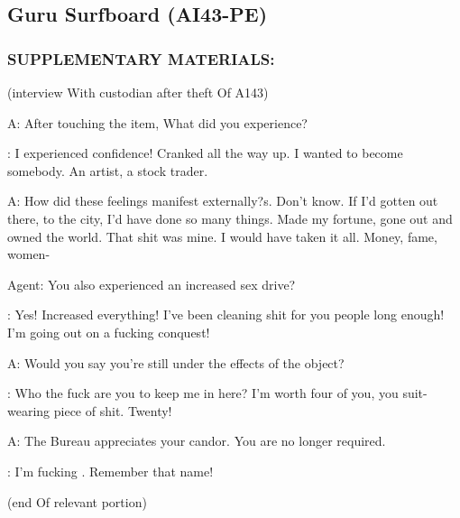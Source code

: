 \subsection*{Guru Surfboard (AI43-PE)}
\subsubsection*{SUPPLEMENTARY MATERIALS:}
\par (interview With custodian
after theft Of A143)
\par A: After touching the item, What did you experience?
\par {}: I experienced confidence! Cranked all the way up. I wanted
to become somebody. An artist, a stock trader.
\par A: How did these feelings manifest externally?s. Don't know. If I'd gotten out there, to the city, I'd have done
so many things. Made my fortune, gone out and owned the world.
That shit was mine. I would have taken it all. Money, fame,
women-
\par Agent: You also experienced an increased sex drive?
\par {}: Yes! Increased everything! I've been cleaning shit for you
people long enough! I'm going out on a fucking conquest!
\par A: Would you say you're still under the effects of the object?
\par {}: Who the fuck are you to keep me in here? I'm worth four of
you, you suit-wearing piece of shit. Twenty!
\par A: The Bureau appreciates your candor. You are no longer
required.
\par {}: I'm  fucking . Remember that name!
\par (end Of relevant portion)